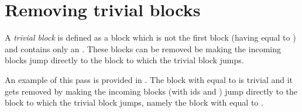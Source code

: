 \section{Removing trivial blocks}

A \textit{trivial block} is defined as a block which is not the first block (having  equal to ) and
contains only an . These blocks can be removed be making the incoming blocks jump
directly to the block to which the trivial block jumps.

An example of this pass is provided in . The block with  equal to
 is trivial and it gets removed by making the incoming blocks (with ids  and ) jump directly to
the block to which the trivial block jumps, namely the block with  equal to .

